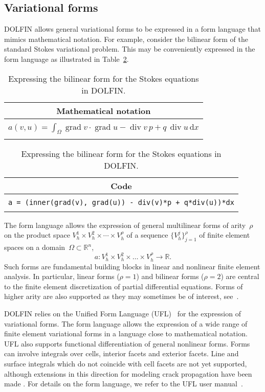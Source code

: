 \documentclass[acmtoms]{acmtrans2m}
\newcommand{\dx}{\,\mathrm{d}x}
\newcommand{\R}{\mathbb{R}}
\newcommand{\dolfin}{DOLFIN}
\newcommand{\codeonly}[1]{\begin{center}
  \begin{tabular}{|c|}
    \hline
    Code \\
    \hline
    \hspace{10cm} \\
    \texttt{#1} \\
    \\
    \hline
  \end{tabular}
\end{center}}
\newcommand{\mathonly}[1]{\begin{center}
  \begin{tabular}{|c|}
    \hline
    Mathematical notation \\
    \hline
    \hspace{10cm} \\
    \texttt{#1} \\
    \\
    \hline
  \end{tabular}
\end{center}}
\DeclareMathOperator{\Div}{div}
\DeclareMathOperator{\Grad}{grad}
\begin{document}
\subsection{Variational forms}

\dolfin{} allows general variational forms to be expressed in a form
language that mimics mathematical notation. For example, consider
the bilinear form of the standard Stokes variational problem. This
may be conveniently expressed in the form language as illustrated in
Table~\ref{tab:codevsmath}.
\begin{table}
  \mathonly{$a(v, u) = \int_{\Omega} \Grad v \cdot \Grad u - \Div v \,  p + q \, \Div u \dx$}
  \codeonly{a = (inner(grad(v), grad(u)) - div(v)*p + q*div(u))*dx}
  \caption{Expressing the bilinear form for the Stokes equations in \dolfin{}.}
  \label{tab:codevsmath}
\end{table}
The form language allows the expression of general multilinear forms
of arity~$\rho$ on the product space $V_h^1 \times V_h^2 \times \cdots
\times V_h^{\rho}$ of a sequence $\{V_h^j\}_{j=1}^{\rho}$ of finite
element spaces on a domain~$\Omega \subset \R^n$,
\begin{equation} \label{eq:a}
  a : V_h^1 \times V_h^2 \times \dots \times V_h^{\rho} \rightarrow \R.
\end{equation}
Such forms are fundamental building blocks in linear and nonlinear
finite element analysis. In particular, linear forms ($\rho=1$) and
bilinear forms ($\rho=2$) are central to the finite element
discretization of partial differential equations. Forms of higher
arity are also supported as they may sometimes be of interest,
see~.

\dolfin{} relies on the Unified Form Language
(UFL)~\cite{www:UFL,Alnaes2009} for the expression of variational forms.
The form language allows the expression of a wide range of finite
element variational forms in a language close to mathematical
notation. UFL also supports functional differentiation of general
nonlinear forms. Forms can involve integrals over cells, interior
facets and exterior facets. Line and surface integrals which do not
coincide with cell facets are not yet supported, although extensions
in this direction for modeling crack propagation have been made
\cite{nikbakht:2009}. For details on the form language, we refer to
the UFL user manual~\cite{www:UFL}.
\end{document}
